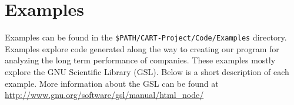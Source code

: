 \documentclass{report}
\begin{document}
\large %
\linespread{1.1} %


\chapter{Examples}

Examples can be found in the \texttt{\$PATH/CART-Project/Code/Examples} directory.  Examples explore code generated along the way to creating our program for analyzing the long term performance of companies.  These examples mostly explore the GNU Scientific Library (GSL).  Below is a short description of each example.  More information about the GSL can be found at \url{http://www.gnu.org/software/gsl/manual/html_node/}
\end{document}
